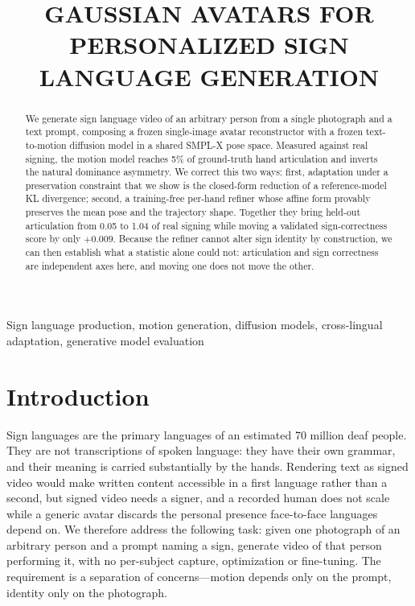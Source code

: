 \documentclass{article}
\title{GAUSSIAN AVATARS FOR PERSONALIZED SIGN LANGUAGE GENERATION}
\begin{document}
\ninept
\topmargin=0mm
\maketitle

\begin{abstract}
We generate sign language video of an arbitrary person from a single photograph
and a text prompt, composing a frozen single-image avatar reconstructor with a
frozen text-to-motion diffusion model in a shared SMPL-X pose space. Measured
against real signing, the motion model reaches 5\% of ground-truth hand
articulation and inverts the natural dominance asymmetry. We correct this two
ways: first, adaptation under a preservation constraint that we show is the
closed-form reduction of a reference-model KL divergence; second, a training-free
per-hand refiner whose affine form provably preserves the mean pose and the
trajectory shape. Together they bring held-out articulation from 0.05 to 1.04 of
real signing while moving a validated sign-correctness score by only $+0.009$.
Because the refiner cannot alter sign identity by construction, we can then
establish what a statistic alone could not: articulation and sign correctness are
independent axes here, and moving one does not move the other.
\end{abstract}

\begin{keywords}
Sign language production, motion generation, diffusion models, cross-lingual
adaptation, generative model evaluation
\end{keywords}



\section{Introduction}
\label{sec:intro}

Sign languages are the primary languages of an estimated 70 million deaf people.
They are not transcriptions of spoken language: they have their own grammar, and
their meaning is carried substantially by the hands. Rendering text as signed
video would make written content accessible in a first language rather than a
second, but signed video needs a signer, and a recorded human does not scale
while a generic avatar discards the personal presence face-to-face languages
depend on. We therefore address the following task: given one photograph of an
arbitrary person and a prompt naming a sign, generate video of that person
performing it, with no per-subject capture, optimization or fine-tuning. The
requirement is a separation of concerns---motion depends only on the prompt,
identity only on the photograph.
\end{document}

